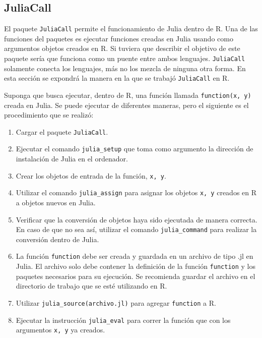 \subsection{JuliaCall}
El paquete \texttt{JuliaCall} permite el funcionamiento de \textsf{Julia} dentro de \textsf{R}. Una de las funciones del paquetes es ejecutar funciones creadas en \textsf{Julia} usando como argumentos objetos creados en \textsf{R}. Si tuviera que describir el objetivo de este paquete sería que funciona como un puente entre ambos lenguajes. \texttt{JuliaCall} solamente conecta los lenguajes, más no los mezcla de ninguna otra forma. En esta sección se expondrá la manera en la que se trabajó \texttt{JuliaCall} en \textsf{R}. 

Suponga que busca ejecutar, dentro de \textsf{R}, una función llamada \texttt{function(x, y)} creada en \textsf{Julia}. Se puede ejecutar de diferentes maneras, pero el siguiente es el procedimiento que se realizó:

\begin{enumerate}
	\item Cargar el paquete \texttt{JuliaCall}. 
	
	\item Ejecutar el comando \texttt{julia\_setup} que toma como argumento la dirección de instalación de \textsf{Julia} en el ordenador. 
	
	\item Crear los objetos de entrada de la función, \texttt{x, y}. 
	
	\item Utilizar el comando \texttt{julia\_assign} para asignar los objetos \texttt{x, y} creados en \textsf{R} a objetos nuevos en \textsf{Julia}. 
	
	\item Verificar que la conversión de objetos haya sido ejecutada de manera correcta. En caso de que no sea así, utilizar el comando \texttt{julia\_command} para realizar la conversión dentro de \textsf{Julia}. 
	
	\item La función \texttt{function} debe ser creada y guardada en un archivo de tipo \textsf{.jl} en \textsf{Julia}. El archivo solo debe contener la definición de la función \texttt{function} y los paquetes necesarios para su ejecución. Se recomienda guardar el archivo en el directorio de trabajo que se esté utilizando en \textsf{R}. 
	
	\item Utilizar \texttt{julia\_source(archivo.jl)} para agregar \texttt{function} a \textsf{R}. 
	
	\item Ejecutar la instrucción \texttt{julia\_eval} para correr la función que con los argumentos \texttt{x, y} ya creados. 
	 
\end{enumerate}

